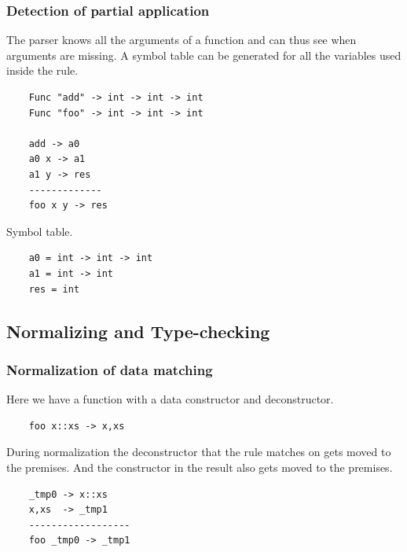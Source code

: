 \begin{frame}[fragile]
    \frametitle{Detection of partial application}
    The parser knows all the arguments of a function and can thus see when arguments are missing.
    A symbol table can be generated for all the variables used inside the rule.

    \begin{lstlisting}
    Func "add" -> int -> int -> int
    Func "foo" -> int -> int -> int

    add -> a0
    a0 x -> a1
    a1 y -> res
    -------------
    foo x y -> res
    \end{lstlisting}

    Symbol table.
    \begin{lstlisting}
    a0 = int -> int -> int
    a1 = int -> int
    res = int
    \end{lstlisting}
\end{frame}

\subsection{Normalizing and Type-checking}


\begin{frame}[fragile]
    \frametitle{Normalization of data matching}
    Here we have a function with a data constructor and deconstructor.
    \begin{lstlisting}
    foo x::xs -> x,xs
    \end{lstlisting}
    During normalization the deconstructor that the rule matches on gets moved to the premises.
    And the constructor in the result also gets moved to the premises.
    \begin{lstlisting}
    _tmp0 -> x::xs
    x,xs  -> _tmp1
    ------------------
    foo _tmp0 -> _tmp1
    \end{lstlisting}
\end{frame}

